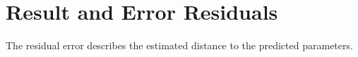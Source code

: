 \section{Result and Error Residuals}
The residual error describes the estimated distance to the predicted parameters.


        
